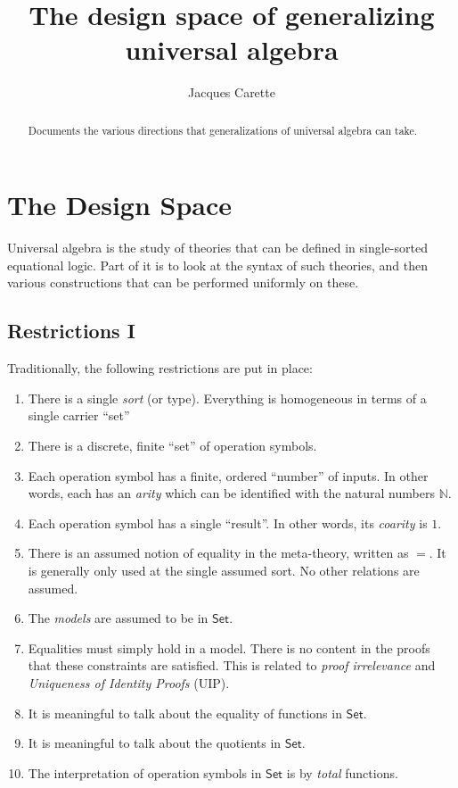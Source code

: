 \documentclass[a4paper,UKenglish,cleveref, autoref, thm-restate]{lipics-v2021}
\title{The design space of generalizing universal algebra}
\author{Jacques Carette}{McMaster University, Canada
  \and \url{http://www.cas.mcmaster.ca/~carette}
}{carette@mcmaster.ca}{https://orcid.org/0000-0001-8993-9804}{Funded in part by NSERC}
\newcommand{\nat}{\ensuremath{\mathbb{N}}}
\newcommand{\Set}{\ensuremath{\mathsf{Set}}}
\begin{document}
\maketitle

\begin{abstract}
Documents the various directions that generalizations of universal algebra
can take.
\end{abstract}

\section{The Design Space}
\label{sec:design-space}

Universal algebra is the study of theories that can be defined in
single-sorted equational logic. Part of it is to look at the syntax of
such theories, and then various constructions that can be performed
uniformly on these.

\subsection{Restrictions I}
Traditionally, the following restrictions are put in place:
\begin{enumerate}
\item \label{1sort} There is a single \emph{sort} (or type). Everything
 is homogeneous in terms of a single carrier ``set''
\item \label{operations} There is a discrete, finite ``set'' of
operation symbols.
\item \label{arity} Each operation symbol has a finite, ordered ``number''
of inputs. In other words, each has an \emph{arity} which can be
identified with the natural numbers \nat.
\item \label{coarity} Each operation symbol has a single ``result''.
In other words, its \emph{coarity} is $1$.
\item \label{equality} There is an assumed notion of equality in the
meta-theory, written as $=$. It is generally only used at the single
assumed sort. No other relations are assumed.
\item \label{set-models} The \emph{models} are assumed to be in 
\Set.
\item \label{UIP} Equalities must simply hold in a model. There is
no content in the proofs that these constraints are satisfied.
This is related to \emph{proof irrelevance} and 
\emph{Uniqueness of Identity Proofs} (UIP).
\item \label{set-equality} It is meaningful to talk about the equality
of functions in \Set.
\item \label{set-quotient} It is meaningful to talk about the quotients
in \Set.
\item \label{totality} The interpretation of operation symbols in \Set
is by \emph{total} functions.
\end{enumerate}
\end{document}
